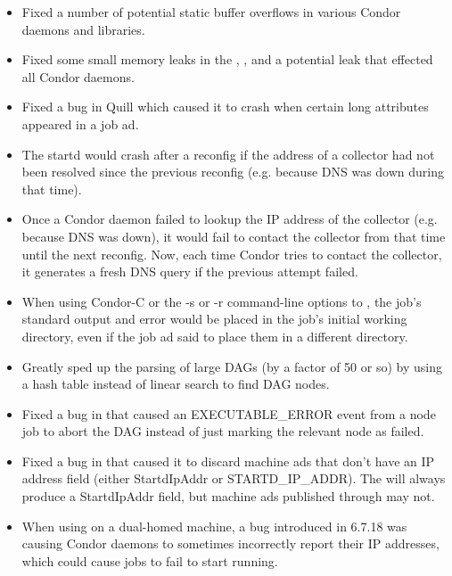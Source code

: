 \begin{itemize}

\item Fixed a number of potential static buffer overflows in various
  Condor daemons and libraries.

\item Fixed some small memory leaks in the ,
  , and a potential leak that effected all Condor
  daemons.

\item Fixed a bug in Quill which caused it to crash when certain
long attributes appeared in a job ad.

\item The startd would crash after a reconfig if the address of a
collector had not been resolved since the previous reconfig
(e.g. because DNS was down during that time).

\item Once a Condor daemon failed to lookup the IP address of the
collector (e.g. because DNS was down), it would fail to contact the
collector from that time until the next reconfig.  Now, each time Condor
tries to contact the collector, it generates a fresh DNS query if the
previous attempt failed.

\item When using Condor-C or the -s or -r command-line options to
, the job's standard output and error would be placed
in the job's initial working directory, even if the job ad said to
place them in a different directory.

\item Greatly sped up the parsing of large DAGs (by a factor of 50
or so) by using a hash table instead of linear search to find DAG nodes.

\item Fixed a bug in  that caused an EXECUTABLE\_ERROR
event from a node job to abort the DAG instead of just marking the
relevant node as failed.

\item Fixed a bug in  that caused it to discard
machine ads that don't have an IP address field (either StartdIpAddr
or STARTD\_IP\_ADDR).  The  will always produce a
StartdIpAddr field, but machine ads published through
 may not.

\item When using  on a dual-homed
machine, a bug introduced in 6.7.18 was causing Condor daemons to
sometimes incorrectly report their IP addresses, which could cause
jobs to fail to start running.


\end{itemize}
